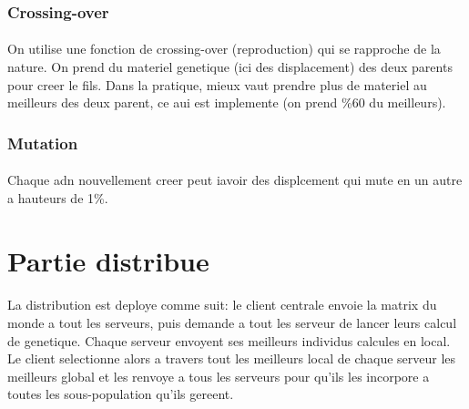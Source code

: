 \documentclass{article}
\begin{document}
    \subsubsection{Crossing-over} %
    \label{ssub:Crossing-over}
     \paragraph{} %
     \label{par:}
        On utilise une fonction de crossing-over (reproduction) qui se rapproche de la
        nature. On prend du materiel genetique (ici des displacement) des deux parents
        pour creer le fils. Dans la pratique, mieux vaut prendre plus de materiel au
        meilleurs des deux parent, ce aui est implemente (on prend \%60 du meilleurs).

    \subsubsection{Mutation} %
    \label{ssub:Mutation}
      \paragraph{} %
      \label{par:}
        Chaque adn nouvellement creer peut iavoir des displcement qui mute en un autre a
        hauteurs de 1\%.

\section{Partie distribue} %
\label{sec:Partie distribue}
  \paragraph{} %
  \label{par:}
    La distribution est deploye comme suit: le client centrale envoie la matrix du monde a
    tout les serveurs, puis demande a tout les serveur de lancer leurs calcul de genetique.
    Chaque serveur envoyent ses meilleurs individus calcules en local. Le client
    selectionne alors a travers tout les meilleurs local de chaque serveur les meilleurs
    global et les renvoye a tous les serveurs pour qu'ils les incorpore a toutes les
    sous-population qu'ils gereent.

\end{document}
